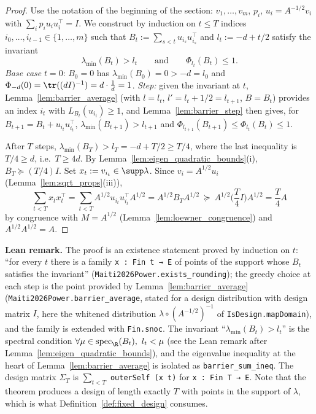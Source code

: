 \begin{proof}
\leanok
{}
Use the notation of the beginning of the section: $v_1,\dots,v_m$, $p_i$, $u_i = A^{-1/2}v_i$
with $\sum_ip_iu_iu_i^\top = I$. We construct by induction on $t \le T$ indices
$i_0,\dots,i_{t-1} \in \{1,\dots,m\}$ such that $B_t := \sum_{s<t}u_{i_s}u_{i_s}^\top$ and
$l_t := -d + t/2$ satisfy the invariant
\[
  \lambda_{\min}(B_t) > l_t \qquad\text{and}\qquad \Phi_{l_t}(B_t) \le 1 .
\]
\emph{Base case} $t = 0$: $B_0 = 0$ has $\lambda_{\min}(B_0) = 0 > -d = l_0$ and
$\Phi_{-d}(0) = \tr((dI)^{-1}) = d\cdot\frac1d = 1$.
\emph{Step:} given the invariant at $t$, Lemma~\ref{lem:barrier_average} (with $l = l_t$,
$l' = l_t + 1/2 = l_{t+1}$, $B = B_t$) provides an index $i_t$ with $L_{B_t}(u_{i_t}) \ge 1$, and
Lemma~\ref{lem:barrier_step} then gives, for $B_{t+1} = B_t + u_{i_t}u_{i_t}^\top$,
$\lambda_{\min}(B_{t+1}) > l_{t+1}$ and $\Phi_{l_{t+1}}(B_{t+1}) \le \Phi_{l_t}(B_t) \le 1$.

After $T$ steps, $\lambda_{\min}(B_T) > l_T = -d + T/2 \ge T/4$, where the last inequality is
$T/4 \ge d$, i.e.\ $T \ge 4d$. By Lemma~\ref{lem:eigen_quadratic_bounds}(i), $B_T \succeq (T/4)I$.
Set $x_t := v_{i_t} \in \supp\lambda$. Since $v_i = A^{1/2}u_i$ (Lemma~\ref{lem:sqrt_props}(iii)),
\[
  \sum_{t<T}x_tx_t^\top = \sum_{t<T}A^{1/2}u_{i_t}u_{i_t}^\top A^{1/2} = A^{1/2}B_TA^{1/2}
  \ \succeq\ A^{1/2}\Big(\frac T4 I\Big)A^{1/2} = \frac T4 A
\]
by congruence with $M = A^{1/2}$ (Lemma~\ref{lem:loewner_congruence}) and $A^{1/2}A^{1/2} = A$.
\end{proof}

\textbf{Lean remark.} The proof is an existence statement proved by induction on $t$:
``for every $t$ there is a family \texttt{x : Fin t → E} of points of the support whose $B_t$
satisfies the invariant'' (\texttt{Maiti2026Power.exists\_rounding}); the greedy choice at each step is
the point provided by Lemma~\ref{lem:barrier_average} (\texttt{Maiti2026Power.barrier\_average}, stated
for a design distribution with design matrix $I$, here the whitened distribution
$\lambda \circ (A^{-1/2})^{-1}$ of \texttt{IsDesign.mapDomain}), and the family is extended with
\texttt{Fin.snoc}. The invariant ``$\lambda_{\min}(B_t) > l_t$'' is the spectral condition
$\forall \mu \in \operatorname{spec}_{\R}(B_t),\ l_t < \mu$ (see the Lean remark after
Lemma~\ref{lem:eigen_quadratic_bounds}), and the eigenvalue inequality at the heart of
Lemma~\ref{lem:barrier_average} is isolated as \texttt{barrier\_sum\_ineq}. The design matrix
$\Sigma_T$ is $\sum_{t<T}$ \texttt{outerSelf (x t)} for \texttt{x : Fin T → E}. Note that
the theorem produces a design of length exactly $T$ with points in the support of $\lambda$,
which is what Definition~\ref{def:fixed_design} consumes.

